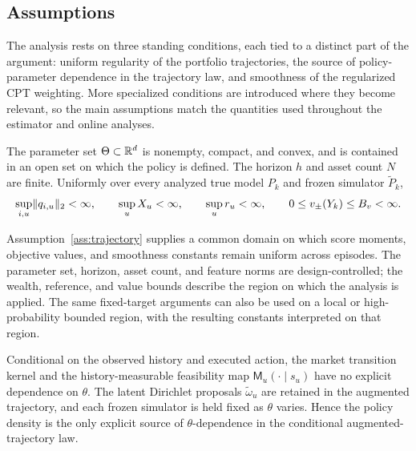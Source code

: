 \subsection{Assumptions}\label{sec:assumptions}

The analysis rests on three standing conditions, each tied to a distinct part of the argument: uniform regularity of the portfolio trajectories, the source of policy-parameter dependence in the trajectory law, and smoothness of the regularized CPT weighting.  More specialized conditions are introduced where they become relevant, so the main assumptions match the quantities used throughout the estimator and online analyses.

\begin{assumption}\label{ass:trajectory}
The parameter set $\Theta\subset\mathbb R^d$ is nonempty, compact, and convex, and is contained in an open set on which the policy is defined.  The horizon $h$ and asset count $N$ are finite.  Uniformly over every analyzed true model $P_k$ and frozen simulator $\widetilde P_k$,
\begin{equation}\label{eq:primitive-bounds}
 \sup_{i,u}\lVert q_{i,u}\rVert_2<\infty,
 \qquad
 \sup_u X_u<\infty,
 \qquad
 \sup_u r_u<\infty,
 \qquad
 0\le v_\pm(Y_k)\le B_v<\infty.
\end{equation}
\end{assumption}

Assumption~\ref{ass:trajectory} supplies a common domain on which score moments, objective values, and smoothness constants remain uniform across episodes.  The parameter set, horizon, asset count, and feature norms are design-controlled; the wealth, reference, and value bounds describe the region on which the analysis is applied.  The same fixed-target arguments can also be used on a local or high-probability bounded region, with the resulting constants interpreted on that region.

\begin{assumption}\label{ass:likelihood}
Conditional on the observed history and executed action, the market transition kernel and the history-measurable feasibility map $\mathsf M_u(\cdot\mid s_u)$ have no explicit dependence on $\theta$.  The latent Dirichlet proposals $\widetilde\omega_u$ are retained in the augmented trajectory, and each frozen simulator is held fixed as $\theta$ varies.  Hence the policy density is the only explicit source of $\theta$-dependence in the conditional augmented-trajectory law.
\end{assumption}

